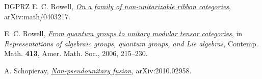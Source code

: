 \documentclass[11pt,oneside]{amsart}
\theoremstyle{remark}
\begin{document}
\begin{thebibliography}{DGPRZ}
E. C. Rowell,
\href{https://arxiv.org/abs/math/0403217}{\emph{On a family of non-unitarizable ribbon categories}},
arXiv:math/0403217.

E. C. Rowell,
\href{https://arxiv.org/abs/math/0503226}{\emph{From quantum groups to unitary modular tensor categories}},
in \emph{Representations of algebraic groups, quantum groups, and Lie algebras},
Contemp. Math. \textbf{413}, Amer. Math. Soc., 2006, 215--230.

A. Schopieray,
\href{https://arxiv.org/abs/2010.02958}{\emph{Non-pseudounitary fusion}},
arXiv:2010.02958.

\end{thebibliography}
\end{document}
